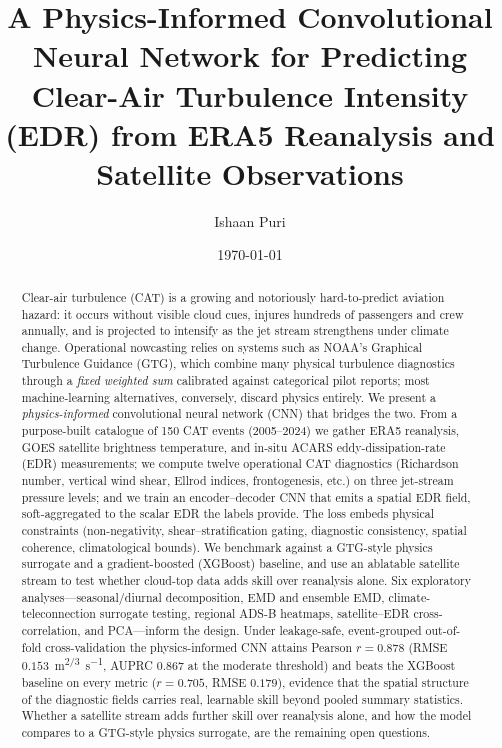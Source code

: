 \documentclass[11pt]{article}
\title{\bfseries A Physics-Informed Convolutional Neural Network for
Predicting Clear-Air Turbulence Intensity (EDR) from ERA5 Reanalysis
and Satellite Observations}
\author{Ishaan Puri}
\date{\today}
\newcommand{\edrunit}{\si{\metre\tothe{2/3}\per\second}}
\begin{document}
\maketitle

\begin{abstract}
Clear-air turbulence (CAT) is a growing and notoriously hard-to-predict
aviation hazard: it occurs without visible cloud cues, injures hundreds
of passengers and crew annually, and is projected to intensify as the
jet stream strengthens under climate change. Operational nowcasting
relies on systems such as NOAA's Graphical Turbulence Guidance (GTG),
which combine many physical turbulence diagnostics through a
\emph{fixed weighted sum} calibrated against categorical pilot reports;
most machine-learning alternatives, conversely, discard physics
entirely. We present a \emph{physics-informed} convolutional neural
network (CNN) that bridges the two. From a purpose-built catalogue of
150 CAT events (2005--2024) we gather ERA5 reanalysis, GOES satellite
brightness temperature, and in-situ ACARS eddy-dissipation-rate (EDR)
measurements; we compute twelve operational CAT diagnostics
(Richardson number, vertical wind shear, Ellrod indices,
frontogenesis, etc.) on three jet-stream pressure levels; and we train
an encoder--decoder CNN that emits a spatial EDR field, soft-aggregated
to the scalar EDR the labels provide. The loss embeds physical
constraints (non-negativity, shear--stratification gating, diagnostic
consistency, spatial coherence, climatological bounds). We benchmark
against a GTG-style physics surrogate and a gradient-boosted (XGBoost)
baseline, and use an ablatable satellite stream to test whether
cloud-top data adds skill over reanalysis alone. Six exploratory
analyses---seasonal/diurnal decomposition, EMD and ensemble EMD,
climate-teleconnection surrogate testing, regional ADS-B heatmaps,
satellite--EDR cross-correlation, and PCA---inform the design. Under
leakage-safe, event-grouped out-of-fold cross-validation the
physics-informed CNN attains Pearson $r=0.878$ (RMSE $0.153$~\edrunit,
AUPRC $0.867$ at the moderate threshold) and beats the XGBoost baseline on
every metric ($r=0.705$, RMSE $0.179$), evidence that the spatial
structure of the diagnostic fields carries real, learnable skill beyond
pooled summary statistics. Whether a satellite stream adds further skill
over reanalysis alone, and how the model compares to a GTG-style physics
surrogate, are the remaining open questions.
\end{abstract}
\end{document}
